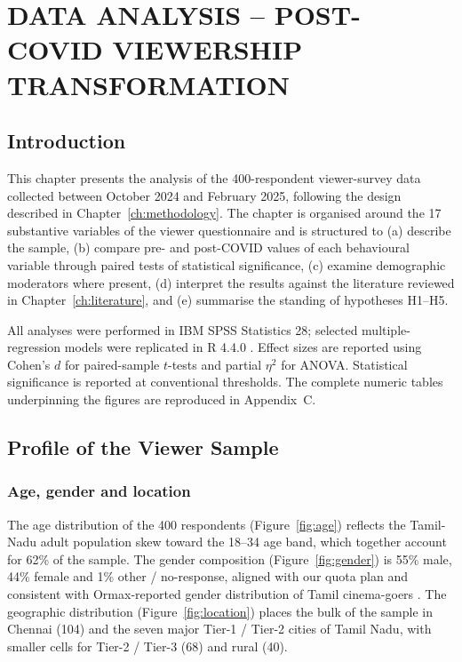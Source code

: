 \chapter{DATA ANALYSIS -- POST-COVID VIEWERSHIP TRANSFORMATION}
\label{ch:viewership}

\section{Introduction}
\label{sec:viewer_intro}

This chapter presents the analysis of the 400-respondent
viewer-survey data collected between October 2024 and February 2025,
following the design described in Chapter~\ref{ch:methodology}.  The
chapter is organised around the 17 substantive variables of the
viewer questionnaire and is structured to (a) describe the sample,
(b) compare pre- and post-COVID values of each behavioural variable
through paired tests of statistical significance, (c) examine
demographic moderators where present, (d) interpret the results
against the literature reviewed in Chapter~\ref{ch:literature}, and
(e) summarise the standing of hypotheses H1--H5.

All analyses were performed in IBM SPSS Statistics 28; selected
multiple-regression models were replicated in R 4.4.0
\citep{rcoreteam2024}.  Effect sizes are reported using Cohen's $d$
for paired-sample $t$-tests and partial $\eta^2$ for ANOVA.
Statistical significance is reported at conventional thresholds.
The complete numeric tables underpinning the figures are
reproduced in Appendix~C.

\section{Profile of the Viewer Sample}
\label{sec:profile}

\subsection{Age, gender and location}

The age distribution of the 400 respondents (Figure~\ref{fig:age})
reflects the Tamil-Nadu adult population skew toward the 18--34 age
band, which together account for 62\% of the sample.  The gender
composition (Figure~\ref{fig:gender}) is 55\% male, 44\% female and
1\% other / no-response, aligned with our quota plan and consistent
with Ormax-reported gender distribution of Tamil cinema-goers
\citep{ormax2023}.  The geographic distribution
(Figure~\ref{fig:location}) places the bulk of the sample in
Chennai (104) and the seven major Tier-1 / Tier-2 cities of Tamil
Nadu, with smaller cells for Tier-2 / Tier-3 (68) and rural (40).

